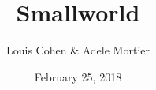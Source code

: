 \documentclass[11pt]{beamer}
\author{Louis Cohen \& Adele Mortier}
\title{Smallworld}
\institute{MPRI 2017}
\date{February 25, 2018}
\begin{document}
\begin{frame}
\titlepage
\end{frame}

\begin{frame}
\tableofcontents
\end{frame}



\end{document}
